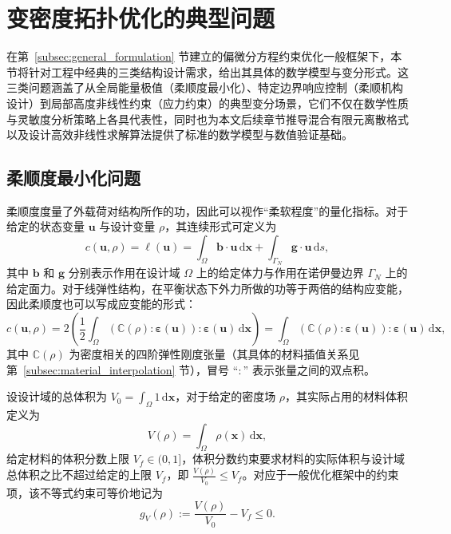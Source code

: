 \section{变密度拓扑优化的典型问题}
\label{sec:typical_problems}

在第~\ref{subsec:general_formulation} 节建立的偏微分方程约束优化一般框架下，本节将针对工程中经典的三类结构设计需求，给出其具体的数学模型与变分形式。这三类问题涵盖了从全局能量极值（柔顺度最小化）、特定边界响应控制（柔顺机构设计）到局部高度非线性约束（应力约束）的典型变分场景，它们不仅在数学性质与灵敏度分析策略上各具代表性，同时也为本文后续章节推导混合有限元离散格式以及设计高效非线性求解算法提供了标准的数学模型与数值验证基础。


\subsection{柔顺度最小化问题}
\label{subsec:min_compliance}

柔顺度度量了外载荷对结构所作的功，因此可以视作“柔软程度”的量化指标。对于给定的状态变量 $\boldsymbol{u}$ 与设计变量 $\rho$，其连续形式可定义为
\[
c(\boldsymbol{u},\rho) = \ell(\boldsymbol{u}) = \int_{\Omega}\boldsymbol{b}\cdot\boldsymbol{u}\,\mathrm{d}\boldsymbol{x} + \int_{\Gamma_N}\boldsymbol{g}\cdot\boldsymbol{u}\,\mathrm{d}s,
\]
其中 $\boldsymbol{b}$ 和 $\boldsymbol{g}$ 分别表示作用在设计域 $\Omega$ 上的给定体力与作用在诺伊曼边界 $\Gamma_N$ 上的给定面力。对于线弹性结构，在平衡状态下外力所做的功等于两倍的结构应变能，因此柔顺度也可以写成应变能的形式：
\[
c(\boldsymbol{u},\rho) = 2\left(\frac{1}{2}\int_{\Omega}(\mathbb{C}(\rho):\boldsymbol{\varepsilon}(\boldsymbol{u})):\boldsymbol{\varepsilon}(\boldsymbol{u})\,\mathrm{d}\boldsymbol{x}\right) = \int_{\Omega}(\mathbb{C}(\rho):\boldsymbol{\varepsilon}(\boldsymbol{u})):\boldsymbol{\varepsilon}(\boldsymbol{u})\,\mathrm{d}\boldsymbol{x},
\]
其中 $\mathbb{C}(\rho)$ 为密度相关的四阶弹性刚度张量（其具体的材料插值关系见第~\ref{subsec:material_interpolation} 节），冒号 “$:$” 表示张量之间的双点积。

设设计域的总体积为 $V_0 = \int_{\Omega} 1\,\mathrm{d}\boldsymbol{x}$，对于给定的密度场 $\rho$，其实际占用的材料体积定义为
\[
V(\rho) = \int_{\Omega}\rho(\boldsymbol{x})\,\mathrm{d}\boldsymbol{x},
\]
给定材料的体积分数上限 $V_f\in(0,1]$，体积分数约束要求材料的实际体积与设计域总体积之比不超过给定的上限 $V_f$，即 $\frac{V(\rho)}{V_0} \leq V_f$。对应于一般优化框架中的约束项，该不等式约束可等价地记为
\[
g_V(\rho) := \frac{V(\rho)}{V_0} - V_f \leq 0.
\]

